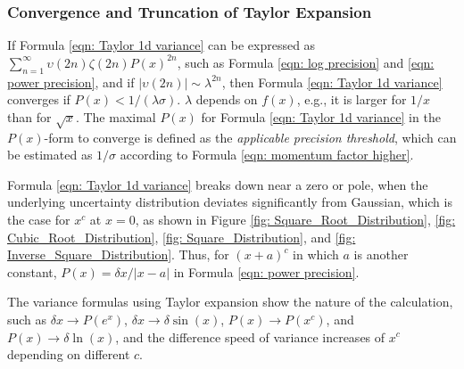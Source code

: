 \documentclass[twoside]{article}
\numberwithin{equation}{section}
\begin{document}
\subsubsection{Convergence and Truncation of Taylor Expansion}


If Formula \eqref{eqn: Taylor 1d variance} can be expressed as $\sum_{n=1}^{\infty} \upsilon(2n) \zeta(2n) P(x)^{2n}$, such as Formula \eqref{eqn: log precision} and \eqref{eqn: power precision}, and if $|\upsilon(2n)| \sim \lambda^{2n}$, then Formula \eqref{eqn: Taylor 1d variance} converges if $P(x) < 1/(\lambda \sigma)$.
$\lambda$ depends on $f(x)$, e.g., it is larger for $1/x$ than for $\sqrt{x}$.
The maximal $P(x)$ for Formula \eqref{eqn: Taylor 1d variance} in the $P(x)$-form to converge is defined as the \emph{applicable precision threshold}, which can be estimated as $1/\sigma$ according to Formula \eqref{eqn: momentum factor higher}.

Formula \eqref{eqn: Taylor 1d variance} breaks down near a zero or pole, when the underlying uncertainty distribution deviates significantly from Gaussian, which is the case for $x^c$ at $x=0$, as shown in Figure \ref{fig: Square_Root_Distribution}, \ref{fig: Cubic_Root_Distribution}, \ref{fig: Square_Distribution}, and \ref{fig: Inverse_Square_Distribution}.
Thus, for $(x+a)^c$ in which $a$ is another constant, $P(x) = \delta x / |x - a|$ in Formula \eqref{eqn: power precision}.

The variance formulas using Taylor expansion show the nature of the calculation, such as $\delta x \rightarrow P(e^x)$, $\delta x \rightarrow \delta \sin(x)$, $P(x) \rightarrow P(x^c)$, and $P(x) \rightarrow \delta \ln(x)$, and the difference speed of variance increases of $x^c$ depending on different $c$.
\end{document}
